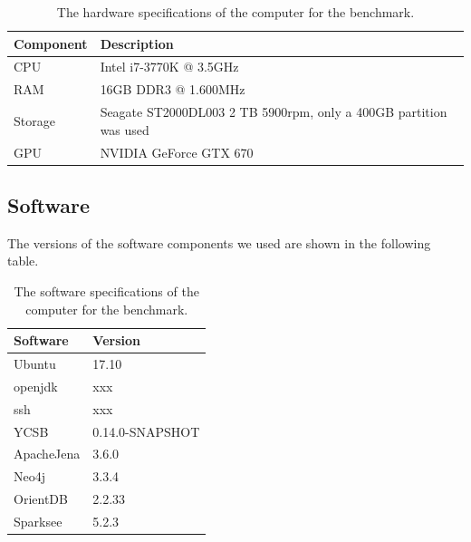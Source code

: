 \begin{table}[!h]
  \begin{minipage}{\textwidth}
    \begin{tabularx}{\textwidth}{ | l | X | }
      \hline
      Component & Description \\ \hline \hline
      CPU & Intel i7-3770K @ 3.5GHz \\ \hline
      RAM & 16GB DDR3 @ 1.600MHz \\ \hline
      Storage & Seagate ST2000DL003 2 TB 5900rpm, only a 400GB partition was used \\ \hline
      GPU & NVIDIA GeForce GTX 670 \\ \hline
    \end{tabularx}
  \end{minipage}
  \caption{The hardware specifications of the computer for the benchmark.}
  \label{tab:hardware}
\end{table}

\subsection{Software}
The versions of the software components we used are shown in the following table.

\begin{table}[h!]
  \begin{minipage}{\textwidth}
    \begin{tabularx}{\textwidth}{ | X | X | }
      \hline
      Software & Version \\ \hline \hline
      Ubuntu & 17.10 \\ \hline
      openjdk & xxx \\ \hline
      ssh & xxx \\ \hline
      YCSB & 0.14.0-SNAPSHOT \\ \hline
      ApacheJena & 3.6.0 \\ \hline
      Neo4j & 3.3.4 \\ \hline
      OrientDB & 2.2.33 \\ \hline
      Sparksee & 5.2.3 \\ \hline
    \end{tabularx}
  \end{minipage}
  \caption{The software specifications of the computer for the benchmark.}
  \label{tab:software}
\end{table}


